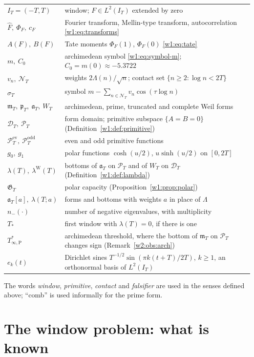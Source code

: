 \documentclass[11pt]{amsart}
\theoremstyle{definition}
\theoremstyle{remark}
\numberwithin{equation}{section}
\newcommand{\IT}{I_T}                                  %
\newcommand{\Fh}{\widehat F}                           %
\newcommand{\cF}{c_F}                                  %
\newcommand{\PhiF}{\Phi_F}                             %
\newcommand{\PT}{\mathcal{P}_T}                        %
\newcommand{\DT}{\mathcal{D}_T}                        %
\newcommand{\NT}{\mathcal{N}_T}                        %
\newcommand{\mT}{\mathfrak{m}_T}                       %
\newcommand{\pT}{\mathfrak{p}_T}                       %
\newcommand{\aT}{\mathfrak{a}_T}                       %
\newcommand{\WT}{W_T}                                  %
\newcommand{\sT}{\sigma_T}                             %
\newcommand{\lam}{\lambda(T)}                          %
\newcommand{\lamW}{\lambda^{\mathrm W}(T)}             %
\newcommand{\Tst}{T_{*}}                               %
\newcommand{\Tarch}{T^{*}_{\infty,\mathrm P}}          %
\begin{document}
\smallskip
\noindent
\begin{tabularx}{\linewidth}{@{}lX@{}}
\toprule
$\IT=(-T,T)$ & window; $F\in L^2(\IT)$ extended by zero\\
$\Fh,\ \PhiF,\ \cF$ & Fourier transform, Mellin-type transform, autocorrelation \eqref{w1:eq:transforms}\\
$A(F),\ B(F)$ & Tate moments $\PhiF(1)$, $\PhiF(0)$ \eqref{w1:eq:tate}\\
$m,\ C_0$ & archimedean symbol \eqref{w1:eq:symbol-m}; $C_0=m(0)\approx-5.3722$\\
$v_n,\ \NT$ & weights $2\Lambda(n)/\sqrt n$; contact set $\{n\ge2:\log n<2T\}$\\
$\sT$ & symbol $m-\sum_{n\in\NT}v_n\cos(\tau\log n)$\\
$\mT,\ \pT,\ \aT,\ \WT$ & archimedean, prime, truncated and complete Weil forms\\
$\DT,\ \PT$ & form domain; primitive subspace $\{A=B=0\}$ (Definition~\ref{w1:def:primitive})\\
$\PT^{\mathrm{ev}},\ \PT^{\mathrm{odd}}$ & even and odd primitive functions\\
$g_0,\ g_1$ & polar functions $\cosh(u/2)$, $u\sinh(u/2)$ on $[0,2T]$\\
$\lam,\ \lamW$ & bottoms of $\aT$ on $\PT$ and of $\WT$ on $\DT$ (Definition~\ref{w1:def:lambda})\\
$\mathfrak G_T$ & polar capacity (Proposition~\ref{w1:prop:polar})\\
$\aT[a],\ \lambda(T;a)$ & forms and bottoms with weights $a$ in place of $\Lambda$\\
$n_-(\cdot)$ & number of negative eigenvalues, with multiplicity\\
$\Tst$ & first window with $\lam=0$, if there is one\\
$\Tarch$ & archimedean threshold, where the bottom of $\mT$ on $\PT$ changes sign (Remark~\ref{w2:obs:arch})\\
$e_k(t)$ & Dirichlet sines $T^{-1/2}\sin(\pi k(t+T)/2T)$, $k\ge1$, an orthonormal basis of $L^2(\IT)$\\
\bottomrule
\end{tabularx}

\smallskip
The words \emph{window}, \emph{primitive}, \emph{contact} and
\emph{falsifier} are used in the senses defined above; ``comb'' is used
informally for the prime form.

\section{The window problem: what is known}\label{w2:sec:structure}
\end{document}
